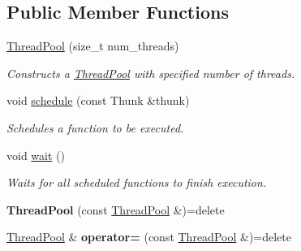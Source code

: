 \subsection*{Public Member Functions}
\begin{DoxyCompactItemize}
\item 
\mbox{\label{classnta_1_1ThreadPool_a134d8778fde34135cc4a3dd6c09a1c51}} 
\hyperlink{classnta_1_1ThreadPool_a134d8778fde34135cc4a3dd6c09a1c51}{Thread\+Pool} (size\+\_\+t num\+\_\+threads)
\begin{DoxyCompactList}\small\item\em Constructs a \hyperlink{classnta_1_1ThreadPool}{Thread\+Pool} with specified number of threads. \end{DoxyCompactList}\item 
\mbox{\label{classnta_1_1ThreadPool_a81b54fdbf4be4be004f23c9583067c76}} 
void \hyperlink{classnta_1_1ThreadPool_a81b54fdbf4be4be004f23c9583067c76}{schedule} (const Thunk \&thunk)
\begin{DoxyCompactList}\small\item\em Schedules a function to be executed. \end{DoxyCompactList}\item 
\mbox{\label{classnta_1_1ThreadPool_a71196ed9500cd4e9a4c1ff713e1e31a4}} 
void \hyperlink{classnta_1_1ThreadPool_a71196ed9500cd4e9a4c1ff713e1e31a4}{wait} ()
\begin{DoxyCompactList}\small\item\em Waits for all scheduled functions to finish execution. \end{DoxyCompactList}\item 
\mbox{\label{classnta_1_1ThreadPool_a07bca86579e4ddde4fd75af12d68b8d6}} 
{\bfseries Thread\+Pool} (const \hyperlink{classnta_1_1ThreadPool}{Thread\+Pool} \&)=delete
\item 
\mbox{\label{classnta_1_1ThreadPool_ab03fa46ce0b78cd13e03ec2fc9ae5263}} 
\hyperlink{classnta_1_1ThreadPool}{Thread\+Pool} \& {\bfseries operator=} (const \hyperlink{classnta_1_1ThreadPool}{Thread\+Pool} \&)=delete
\end{DoxyCompactItemize}
